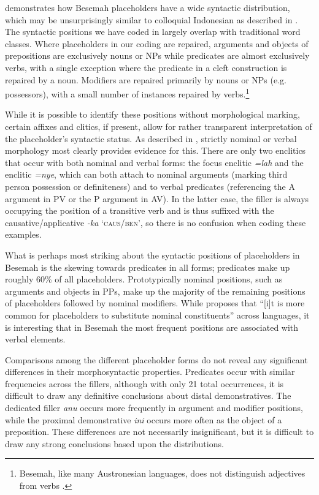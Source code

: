 \documentclass[output=paper,
\ChapterDOI{10.5281/zenodo.15697583}
colorlinks,
citecolor=brown]{langscibook}
\begin{document}
 demonstrates how Besemah placeholders have a wide syntactic distribution, which may be unsurprisingly similar to colloquial Indonesian as described in \textcite{wouk2005syntax} \parencite[see also][13--14]{podlesskaya2010parameters}. The syntactic positions we have coded in  largely overlap with traditional word classes. Where placeholders in our coding are repaired, arguments and objects of prepositions are exclusively nouns or NPs while predicates are almost exclusively verbs, with a single exception where the predicate in a cleft construction is repaired by a noun. Modifiers are repaired primarily by nouns or NPs (e.g. possessors), with a small number of instances repaired by verbs.\footnote{Besemah, like many Austronesian languages, does not distinguish adjectives from verbs \parencite[see ][]{mosel2023word}.}

While it is possible to identify these positions without morphological marking, certain affixes and clitics, if present, allow for rather transparent interpretation of the placeholder's syntactic status. As described in , strictly nominal or verbal morphology most clearly provides evidence for this. There are only two enclitics that occur with both nominal and verbal forms: the focus enclitic \textit{=lah} and the enclitic \textit{=nye}, which can both attach to nominal arguments (marking third person possession or definiteness) and to verbal predicates (referencing the A argument in PV or the P argument in AV). In the latter case, the filler is always occupying the position of a transitive verb and is thus suffixed with the causative/applicative \textit{-ka} `\textsc{caus/ben}', so there is no confusion when coding these examples.

What is perhaps most striking about the syntactic positions of placeholders in Besemah is the skewing towards predicates in all forms; predicates make up roughly 60\% of all placeholders. Prototypically nominal positions, such as arguments and objects in PPs, make up the majority of the remaining positions of placeholders followed by nominal modifiers. While \textcite{podlesskaya2010parameters} proposes that ``[i]t is more common for placeholders to substitute nominal constituents'' across languages, it is interesting that in Besemah the most frequent positions are associated with verbal elements. 

Comparisons among the different placeholder forms do not reveal any significant differences in their morphosyntactic properties. Predicates occur with similar frequencies across the fillers, although with only 21 total occurrences, it is difficult to draw any definitive conclusions about distal demonstratives. The dedicated filler \textit{anu} occurs more frequently in argument and modifier positions, while the proximal demonstrative \textit{ini} occurs more often as the object of a preposition. These differences are not necessarily insignificant, but it is difficult to draw any strong conclusions based upon the distributions.
\end{document}
